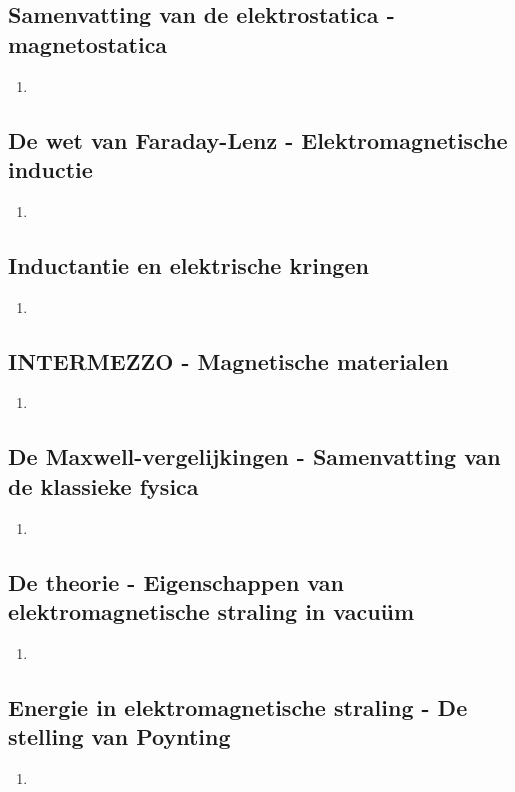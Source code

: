 \documentclass[12pt]{article}
\begin{document}
    \subsection{Samenvatting van de elektrostatica - magnetostatica}
    \begin{enumerate}
        \item 
    \end{enumerate}
    \subsection{De wet van Faraday-Lenz - Elektromagnetische inductie}
    \begin{enumerate}
        \item 
    \end{enumerate}
    \subsection{Inductantie en elektrische kringen}
    \begin{enumerate}
        \item 
    \end{enumerate}
    \subsection{INTERMEZZO - Magnetische materialen}
    \begin{enumerate}
        \item 
    \end{enumerate}
    \subsection{De Maxwell-vergelijkingen - Samenvatting van de klassieke fysica}
    \begin{enumerate}
        \item 
    \end{enumerate}
    \subsection{De theorie - Eigenschappen van elektromagnetische straling in vacuüm}
    \begin{enumerate}
        \item 
    \end{enumerate}
    \subsection{Energie in elektromagnetische straling - De stelling van Poynting}
    \begin{enumerate}
        \item 
    \end{enumerate}
\end{document}
